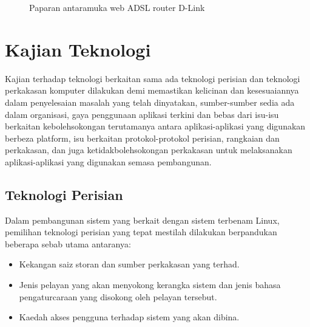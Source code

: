 \begin{enumerate}
\begin{figure}[!h]
\caption[Paparan antaramuka web ADSL router D-Link]{Paparan antaramuka web ADSL router D-Link}
\label{c2:f6}
\end{figure}

\end{enumerate}

\section{Kajian Teknologi}
Kajian terhadap teknologi berkaitan sama ada teknologi perisian dan teknologi perkakasan komputer dilakukan demi memastikan kelicinan dan kesesuaiannya dalam penyelesaian masalah yang telah dinyatakan, sumber-sumber sedia ada dalam organisasi, gaya penggunaan aplikasi terkini dan bebas dari isu-isu berkaitan kebolehsokongan terutamanya antara aplikasi-aplikasi yang digunakan berbeza platform, isu berkaitan protokol-protokol perisian, rangkaian dan perkakasan, dan juga ketidakbolehsokongan perkakasan untuk melaksanakan aplikasi-aplikasi yang digunakan semasa pembangunan.

\subsection{Teknologi Perisian}

Dalam pembangunan sistem yang berkait dengan sistem terbenam Linux, pemilihan teknologi perisian yang tepat mestilah dilakukan berpandukan beberapa sebab utama antaranya:
\begin{itemize}
\item Kekangan saiz storan dan sumber perkakasan yang terhad.

\item Jenis pelayan yang akan menyokong kerangka sistem dan jenis bahasa pengaturcaraan yang disokong oleh pelayan tersebut.

\item Kaedah akses pengguna terhadap sistem yang akan dibina.

\end{itemize}

